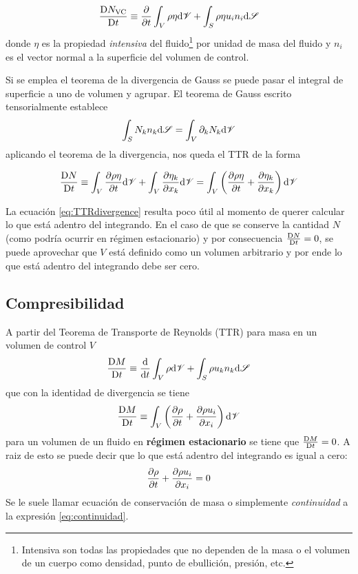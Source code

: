 \begin{equation} \label{eq:TTRgeneral}
    \frac{\textrm{D} N_{\textrm{VC}}}{\textrm{D} t} \equiv \frac{\partial     }{\partial t} \int_{V} \rho \eta \textrm{d} \mathscr{V} + \int_{S}\rho \eta u_i n_i \textrm{d} \mathscr{S}
\end{equation}
donde $\eta$ es la propiedad \textit{intensiva} del fluido\footnote{Intensiva son todas las propiedades que no dependen de la masa o el volumen de un cuerpo como densidad, punto de ebullición, presión, etc.} por unidad de masa del fluido y $n_i$ es el vector normal a la superficie del volumen de control.

Si se emplea el teorema de la divergencia de Gauss se puede pasar el integral de superficie a uno de volumen y agrupar. El teorema de Gauss escrito tensorialmente establece
\[
\int_{S}  N_k n_k \textrm{d} \mathscr{S} = \int_{V} \partial_k N_k \textrm{d} \mathscr{V}
\]
aplicando el teorema de la divergencia, nos queda el TTR de la forma

\begin{equation} \label{eq:TTRdivergence}
\frac{\textrm{D} N}{\textrm{D} t} \equiv \int_{V} \frac{\partial \rho \eta}{\partial t}\textrm{d} \mathscr{V} +\int_V \frac{\partial \eta_k}{\partial x_k} \textrm{d} \mathscr{V}=\int_V\left(\frac{\partial \rho \eta}{\partial t} + \frac{\partial \eta_k}{\partial x_k}\right)\textrm{d} \mathscr{V}
\end{equation}

La ecuación \ref{eq:TTRdivergence} resulta poco útil al momento de querer calcular lo que está adentro del integrando. En el caso de que se conserve la cantidad $N$ (como podría ocurrir en régimen estacionario) y por consecuencia $\frac{\textrm{D} N}{\textrm{D} t}=0$, se puede aprovechar que $V$ está definido como un volumen arbitrario y por ende lo que está adentro del integrando debe ser cero.

\subsection{Compresibilidad}
A partir del Teorema de Transporte de Reynolds (TTR) para masa en un volumen de control $V$
$$\frac{\textrm{D} M}{\textrm{D} t}\equiv\frac{\textrm{d} }{\textrm{d} t}\int_V \rho\textrm{d} \mathscr{V} +\int_S \rho u_k n_k \textrm{d} \mathscr{S} $$
que con la identidad de divergencia se tiene
$$\frac{\textrm{D} M}{\textrm{D} t} \equiv \int_V \left( \frac{\partial \rho}{\partial t}+\frac{\partial \rho u_i}{\partial x_i} \right) \textrm{d} \mathscr{V} $$
para un volumen de un fluido en \textbf{régimen estacionario} se tiene que $\frac{\textrm{D} M}{\textrm{D} t}=0$. A raiz de esto se puede decir que lo que está adentro del integrando es igual a cero:
\begin{equation} \label{eq:continuidad}
    \frac{\partial \rho}{\partial t} +\frac{\partial \rho u_i}{\partial x_i}=0
\end{equation}
Se le suele llamar ecuación de conservación de masa o simplemente \emph{continuidad} a la expresión \ref{eq:continuidad}.\par

